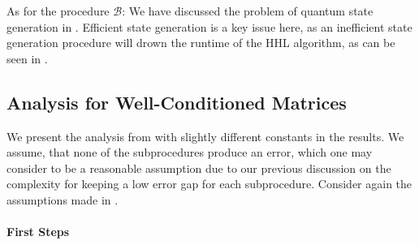 As for the procedure \(\mathcal{B}\): We have discussed the problem of quantum state generation in . Efficient state generation is a key issue here, as an inefficient state generation procedure will drown the runtime of the HHL algorithm, as can be seen in .

\subsection{Analysis for Well-Conditioned Matrices }

We present the analysis from \cite{Harrow2008} with slightly different constants in the results. We assume, that none of the subprocedures produce an error, which one may consider to be a reasonable assumption due to our previous discussion on the complexity for keeping a low error gap for each subprocedure. Consider again the assumptions made in .

\paragraph*{First Steps} \phantom{}\\\phantom{}

